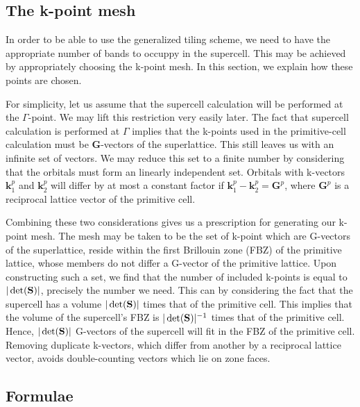 \documentclass{article}
\begin{document}
\subsection{The k-point mesh}
In order to be able to use the generalized tiling scheme, we need to
have the appropriate number of bands to occuppy in the supercell.
This may be achieved by appropriately choosing the k-point mesh.  In
this section, we explain how these points are chosen.  

For simplicity, let us assume that the supercell calculation will be
performed at the $\Gamma$-point.  We may lift this restriction very
easily later.  The fact that supercell calculation is performed at
$\Gamma$ implies that the k-points used in the primitive-cell
calculation must be $\mathbf{G}$-vectors of the superlattice.  This
still leaves us with an infinite set of vectors.  We may reduce this
set to a finite number by considering that the orbitals must form an
linearly independent set.  Orbitals with k-vectors $\mathbf{k}^p_1$
and $\mathbf{k}^p_2$ will differ by at most a constant factor if
$\mathbf{k}^p_1 - \mathbf{k}^p_2 = \mathbf{G}^p$, where $\mathbf{G}^p$
is a reciprocal lattice vector of the primitive cell.  

Combining these two considerations gives us a prescription for
generating our k-point mesh.  The mesh may be taken to be the set of
k-point which are G-vectors of the superlattice, reside within the
first Brillouin zone (FBZ) of the primitive lattice, whose members do
not differ a G-vector of the primitive lattice.  Upon constructing
such a set, we find that the number of included k-points is equal to
$|\det(\mathbf{S})|$, precisely the number we need.  This can by considering
the fact that the supercell has a volume $|\det(\mathbf{S})|$ times that of
the primitive cell.  This implies that the volume of the supercell's
FBZ is $|\det(\mathbf{S})|^{-1}$ times that of the primitive cell.  Hence,
$|\det(\mathbf{S})|$ G-vectors of the supercell will fit in the FBZ of the
primitive cell.  Removing duplicate k-vectors, which differ from
another by a reciprocal lattice vector, avoids double-counting vectors
which lie on zone faces.

\subsection{Formulae}
\newcommand{\Amat}{\mathbf{A}} 
\newcommand{\Bmat}{\mathbf{B}} 
\newcommand{\vk}{\mathbf{k}}
\newcommand{\vt}{\mathbf{t}}
\end{document}
